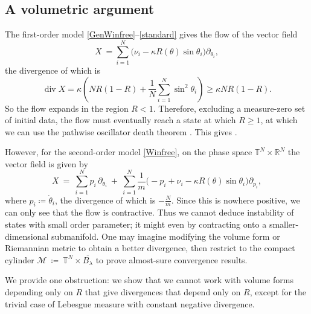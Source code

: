 \documentclass[11pt,reqno]{amsart}
\newcounter{name}
\newcommand{\R}{\mathbb{R}}
\newcommand{\T}{\mathbb{T}}
\theoremstyle{definition}
\theoremstyle{remark}
\begin{document}
\subsection{A volumetric argument}
\label{subsec:volume}

The first-order model \eqref{GenWinfree}--\eqref{standard} gives the flow of the vector field
\[
X\ = \sum_{i=1}^N\bigl(\nu_i-\kappa R(\theta)\sin\theta_i\bigr)\partial_{\theta_i},
\]
the divergence of which is
\[
\operatorname{div} X = \kappa\left(NR(1-R)+\frac 1N \sum_{i=1}^N \sin^2\theta_i\right) \ge \kappa NR(1-R).
\]
So the flow expands in the region $R<1$. Therefore, excluding a measure-zero set of initial data, the flow must eventually reach a state at which $R\ge 1$, at which we can use the pathwise oscillator death theorem \cite[Corollary 16]{ryoo2026oscillator}. This gives \cite[Theorem 1]{ryoo2026oscillator}.

However, for the second-order model \eqref{Winfree}, on the phase space $\mathbb T^N\times\R^N$ the vector field is given by
\[
X\ =\ \sum_{i=1}^N p_i\,\partial_{\theta_i}
\ +\ \sum_{i=1}^N\frac{1}{m}\bigl(-p_i+\nu_i-\kappa R(\theta)\sin\theta_i\bigr)\partial_{p_i},
\]
where  $p_i\coloneqq\dot\theta_i$, the divergence of which is $-\frac{N}{m}$. Since this is nowhere positive, we can only see that the flow is contractive. Thus we cannot deduce instability of states with small order parameter; it might even by contracting onto a smaller-dimensional submanifold. One may imagine modifying the volume form or Riemannian metric to obtain a better divergence, then restrict to the compact cylinder $\mathcal M\ \coloneqq\ \T^N\times\overline{B_\lambda}$ to prove almost-sure convergence results. 

We provide one obstruction: we show that we cannot work with volume forms depending only on $R$ that give divergences that depend only on $R$, except for the trivial case of Lebesgue measure with constant negative divergence.
\end{document}
